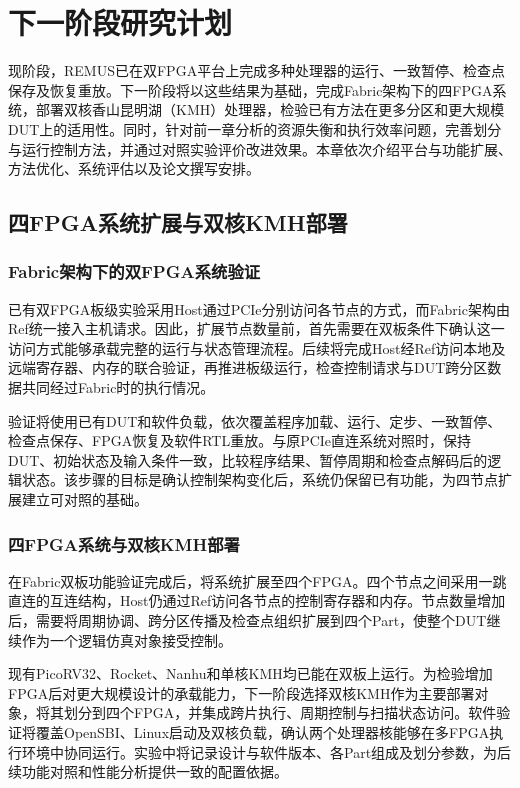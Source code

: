 \chapter{下一阶段研究计划}
\label{chap:midterm-next-plan}

现阶段，REMUS已在双FPGA平台上完成多种处理器的运行、一致暂停、检查点保存及恢复重放。下一阶段将以这些结果为基础，完成Fabric架构下的四FPGA系统，部署双核香山昆明湖（KMH）处理器，检验已有方法在更多分区和更大规模DUT上的适用性。同时，针对前一章分析的资源失衡和执行效率问题，完善划分与运行控制方法，并通过对照实验评价改进效果。本章依次介绍平台与功能扩展、方法优化、系统评估以及论文撰写安排。

\section{四FPGA系统扩展与双核KMH部署}
\label{sec:midterm-plan-four-fpga}

\subsection{Fabric架构下的双FPGA系统验证}

已有双FPGA板级实验采用Host通过PCIe分别访问各节点的方式，而Fabric架构由Ref统一接入主机请求。因此，扩展节点数量前，首先需要在双板条件下确认这一访问方式能够承载完整的运行与状态管理流程。后续将完成Host经Ref访问本地及远端寄存器、内存的联合验证，再推进板级运行，检查控制请求与DUT跨分区数据共同经过Fabric时的执行情况。

验证将使用已有DUT和软件负载，依次覆盖程序加载、运行、定步、一致暂停、检查点保存、FPGA恢复及软件RTL重放。与原PCIe直连系统对照时，保持DUT、初始状态及输入条件一致，比较程序结果、暂停周期和检查点解码后的逻辑状态。该步骤的目标是确认控制架构变化后，系统仍保留已有功能，为四节点扩展建立可对照的基础。

\subsection{四FPGA系统与双核KMH部署}

在Fabric双板功能验证完成后，将系统扩展至四个FPGA。四个节点之间采用一跳直连的互连结构，Host仍通过Ref访问各节点的控制寄存器和内存。节点数量增加后，需要将周期协调、跨分区传播及检查点组织扩展到四个Part，使整个DUT继续作为一个逻辑仿真对象接受控制。

现有PicoRV32、Rocket、Nanhu和单核KMH均已能在双板上运行。为检验增加FPGA后对更大规模设计的承载能力，下一阶段选择双核KMH作为主要部署对象，将其划分到四个FPGA，并集成跨片执行、周期控制与扫描状态访问。软件验证将覆盖OpenSBI、Linux启动及双核负载，确认两个处理器核能够在多FPGA执行环境中协同运行。实验中将记录设计与软件版本、各Part组成及划分参数，为后续功能对照和性能分析提供一致的配置依据。

